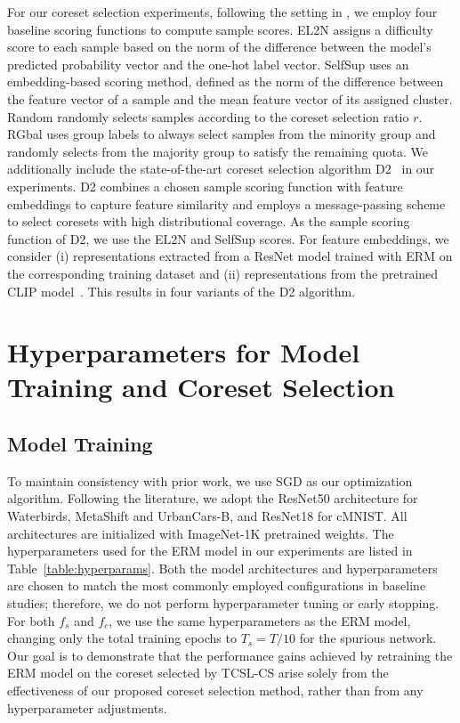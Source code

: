 \documentclass[letter,11pt]{article}
\begin{document}
For our coreset selection experiments, following the setting in \citep{CS_LR}, we employ four baseline scoring functions to compute sample scores. EL2N \citep{EL2N} assigns a difficulty score to each sample based on the norm of the difference between the model’s predicted probability vector and the one-hot label vector. SelfSup \citep{SelfSup} uses an embedding-based scoring method, defined as the norm of the difference between the feature vector of a sample and the mean feature vector of its assigned cluster. Random \citep{CS_LR} randomly selects samples according to the coreset selection ratio $r$. RGbal \citep{CS_LR} uses group labels to always select samples from the minority group and randomly selects from the majority group to satisfy the remaining quota. We additionally include the state-of-the-art coreset selection algorithm D2~\cite{D2} in our experiments. D2 combines a chosen sample scoring function with feature embeddings to capture feature similarity and employs a message-passing scheme to select coresets with high distributional coverage. As the sample scoring function of D2, we use the EL2N and SelfSup scores. For feature embeddings, we consider (i) representations extracted from a ResNet model trained with ERM on the corresponding training dataset and (ii) representations from the pretrained CLIP model~\cite{CLIP}. This results in four variants of the D2 algorithm.
\section{Hyperparameters for Model Training and Coreset Selection}\label{sec:app_hyperparams}

\subsection{Model Training}
To maintain consistency with prior work, we use SGD as our optimization algorithm. Following the literature, we adopt the ResNet50 architecture for Waterbirds, MetaShift and UrbanCars-B, and ResNet18 for cMNIST. All architectures are initialized with ImageNet-1K \citep{Imagenet} pretrained weights. The hyperparameters used for the ERM model in our experiments are listed in Table~\ref{table:hyperparams}. Both the model architectures and hyperparameters are chosen to match the most commonly employed configurations in baseline studies; therefore, we do not perform hyperparameter tuning or early stopping. For both $f_s$ and $f_c$, we use the same hyperparameters as the ERM model, changing only the total training epochs to $T_s\!=\!T/10$ for the spurious network. Our goal is to demonstrate that the performance gains achieved by retraining the ERM model on the coreset selected by TCSL-CS arise solely from the effectiveness of our proposed coreset selection method, rather than from any hyperparameter adjustments.
\end{document}
